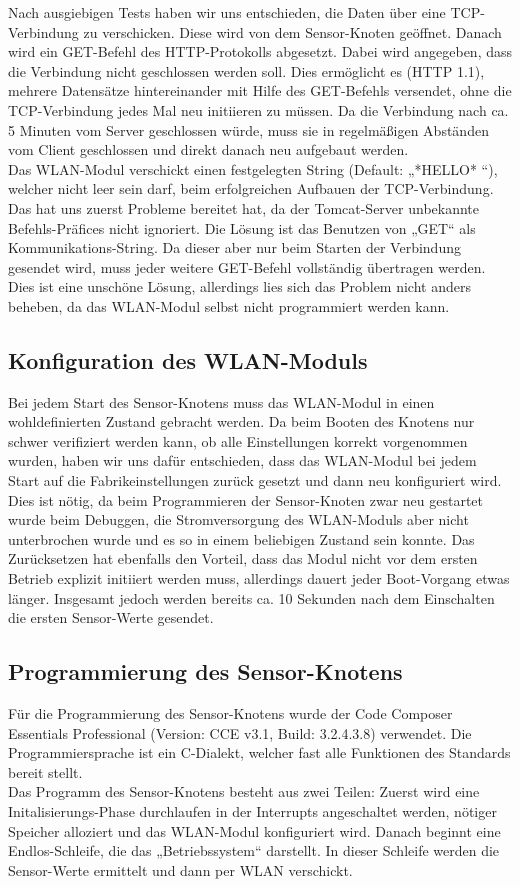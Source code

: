 \documentclass[12pt,a4paper,twoside]{article}
\begin{document}
Nach ausgiebigen Tests haben wir uns entschieden, die Daten über eine TCP-Verbindung zu verschicken. Diese wird von dem Sensor-Knoten geöffnet. Danach wird ein GET-Befehl des HTTP-Protokolls abgesetzt. Dabei wird angegeben, dass die Verbindung nicht geschlossen werden soll. Dies ermöglicht es (HTTP 1.1), mehrere Datensätze hintereinander mit Hilfe des GET-Befehls versendet, ohne die TCP-Verbindung jedes Mal neu initiieren zu müssen. Da die Verbindung nach ca. 5 Minuten vom Server geschlossen würde, muss sie in regelmäßigen Abständen vom Client geschlossen und direkt danach neu aufgebaut werden.  \\
Das WLAN-Modul verschickt einen festgelegten String (Default: „*HELLO* “), welcher nicht leer sein darf, beim erfolgreichen Aufbauen der TCP-Verbindung. Das hat uns zuerst Probleme bereitet hat, da der Tomcat-Server unbekannte Befehls-Präfices nicht ignoriert. Die Lösung ist das Benutzen von „GET“ als Kommunikations-String. Da dieser aber nur beim Starten der Verbindung gesendet wird, muss jeder weitere GET-Befehl vollständig übertragen werden. Dies ist eine unschöne Lösung, allerdings lies sich das Problem nicht anders beheben, da das WLAN-Modul selbst nicht programmiert werden kann.

\subsection{Konfiguration des WLAN-Moduls}
Bei jedem Start des Sensor-Knotens muss das WLAN-Modul in einen wohldefinierten Zustand gebracht werden. Da beim Booten des Knotens nur schwer verifiziert werden kann, 
ob alle Einstellungen korrekt vorgenommen wurden, haben wir uns dafür entschieden, dass das WLAN-Modul bei jedem Start auf die Fabrikeinstellungen zurück gesetzt und dann neu konfiguriert wird.
Dies ist nötig, da beim Programmieren der Sensor-Knoten zwar neu gestartet wurde beim Debuggen, die Stromversorgung des WLAN-Moduls aber nicht unterbrochen wurde und es so in einem beliebigen Zustand sein konnte. 
Das Zurücksetzen hat ebenfalls den Vorteil, dass das Modul nicht vor dem ersten Betrieb explizit initiiert werden muss, allerdings dauert jeder Boot-Vorgang etwas länger. Insgesamt jedoch werden bereits ca. 10 Sekunden nach dem Einschalten die ersten Sensor-Werte gesendet. 


\subsection{Programmierung des Sensor-Knotens}
Für die Programmierung des Sensor-Knotens wurde der Code Composer Essentials Professional (Version: CCE v3.1, Build: 3.2.4.3.8)  verwendet. Die Programmiersprache ist ein C-Dialekt, welcher fast alle Funktionen des Standards bereit stellt. \\
Das Programm des Sensor-Knotens besteht aus zwei Teilen: Zuerst wird eine Initalisierungs-Phase durchlaufen in der Interrupts angeschaltet werden, nötiger Speicher alloziert und das WLAN-Modul konfiguriert wird. Danach beginnt eine Endlos-Schleife, die das „Betriebssystem“ darstellt. 
In dieser Schleife werden die Sensor-Werte ermittelt und dann per WLAN verschickt.
\end{document}
